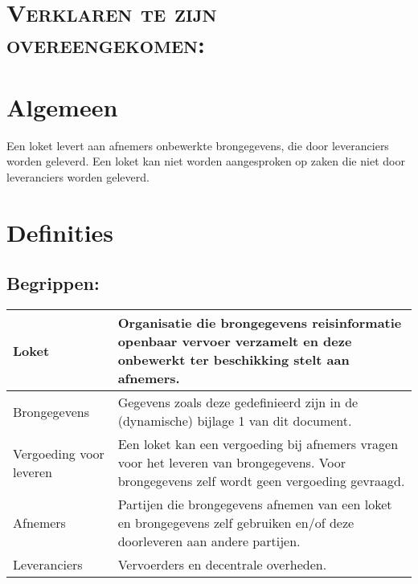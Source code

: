 \documentclass[10pt, a4paper]{article}
\begin{document}
\section*{\textsc{Verklaren te zijn overeengekomen:}}
\section{Algemeen}
Een loket levert aan afnemers onbewerkte brongegevens, die door leveranciers worden geleverd.
Een loket kan niet worden aangesproken op zaken die niet door leveranciers worden geleverd.
\newpage

\section{Definities}

\subsection*{Begrippen:}
\begin{tabular}{l|p{10cm}}
Loket                       & Organisatie die brongegevens reisinformatie openbaar vervoer verzamelt en deze onbewerkt ter beschikking stelt aan afnemers. \\
\hline
Brongegevens                & Gegevens zoals deze gedefinieerd zijn in de (dynamische) bijlage 1 van dit document. \\
\hline
Vergoeding voor leveren     & Een loket kan een vergoeding bij afnemers vragen voor het leveren van brongegevens. Voor brongegevens zelf wordt geen vergoeding gevraagd. \\
\hline
Afnemers                    & Partijen die brongegevens afnemen van een loket en brongegevens zelf gebruiken en/of deze doorleveren aan andere partijen. \\
\hline
Leveranciers                & Vervoerders en decentrale overheden. \\
\end{tabular}
\end{document}
